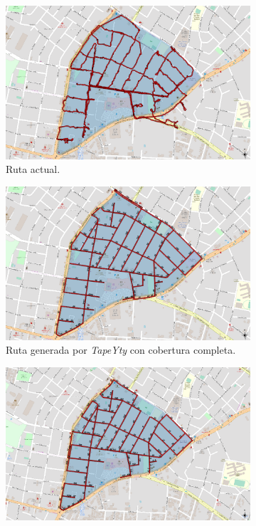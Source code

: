 \documentclass[spanish, conference]{IEEEtran}
\begin{document}
{\begin{figure}[!tbp]
  \centering
  \begin{subfigure}[b]{0.45\textwidth}
    \includegraphics[width=\textwidth]{imagenes/recorrido83Actual.png}
    \caption{Ruta actual.}
    \label{fig:RecorridoActualZona83}
  \end{subfigure}
  \hfill
  \begin{subfigure}[b]{0.45\textwidth}
    \includegraphics[width=\textwidth]{imagenes/recorrido83.png}
    \caption{Ruta generada por \textit{TapeYty} con cobertura completa.}
    \label{fig:RecorridoTapeYtyZona83}
  \end{subfigure}
  \begin{subfigure}[b]{1\textwidth}
        \includegraphics[width=\textwidth]{imagenes/recorrido83GeneradoNoHabilitados.png}

\end{subfigure}
\end{figure}}
\end{document}
